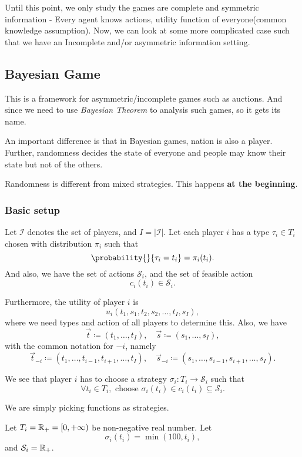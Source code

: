 \hr

Until this point, we only study the games are complete and symmetric information - Every agent knows actions, utility function of everyone(common knowledge assumption).
Now, we can look at some more complicated case such that we have an Incomplete and/or asymmetric information setting.

\subsection{Bayesian Game}
This is a framework for asymmetric/incomplete games such as auctions. And since we need to use \emph{Bayesian Theorem} to analysis such games, so
it gets its name.

An important difference is that in Bayesian games, nation is also a player. Further, randomness decides the state of everyone and people may
know their state but not of the others.

\begin{note}
	Randomness is different from mixed strategies. This happens \textbf{at the beginning}.
\end{note}

\subsubsection{Basic setup}
Let \(\mathcal{I} \) denotes the set of players, and \(I = \left\vert \mathcal{I}  \right\vert \). Let each player \(i\) has a type
\(\tau_{i}\in T_{i}\) chosen with distribution \(\pi_i\) such that
\[
	\probability{}{\tau_{i} = t_{i}} = \pi_i(t_{i}) .
\]
And also, we have the set of actions \(\mathcal{S}_{i}\), and the set of feasible action
\[
	c_{i}(t_{i})\in \mathcal{S}_{i}.
\]

Furthermore, the utility of player \(i\) is
\[
	u_{i}(t_1, s_1, t_2, s_2, \ldots , t_I, s_I),
\]
where we need types and action of all players to determine this. Also, we have
\[
	\vec{t}\coloneqq (t_1, \ldots , t_I),\quad \vec{s} \coloneqq (s_1, \ldots , s_I),
\]
with the common notation for \(-i\), namely
\[
	\vec{t}_{-i} \coloneqq (t_1, \ldots , t_{i-1}, t_{i+1}, \ldots , t_{I}),\quad \vec{s}_{-i} \coloneqq (s_1, \ldots , s_{i-1}, s_{i+1}, \ldots , s_{I}).
\]

We see that player \(i\) has to choose a strategy \(\sigma_{i}\colon T_{i}\to \mathcal{S}_{i}\) such that
\[
	\forall t_{i}\in T_{i}, \text{ choose }\sigma_{i}(t_{i})\in c_{i}(t_{i})\subseteq \mathcal{S}_{i}.
\]
\begin{intuition}
	We are simply picking functions as strategies.
\end{intuition}
\begin{eg}
	Let \(T_{i} = \mathbb{\MakeUppercase{R}}_+ = [0, +\infty )\) be non-negative real number. Let
	\[
		\sigma_{i}(t_{i}) = \min(100, t_{i}),
	\]
	and \(\mathcal{S}_{i} = \mathbb{\MakeUppercase{R}}_+\).

	\begin{figure}[H]
		\centering
		\label{fig:action-function-eg}
	\end{figure}
\end{eg}

